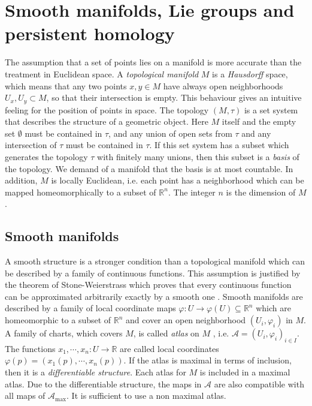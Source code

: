 \documentclass[runningheads,orivec]{llncs}
\begin{document}
\section{Smooth manifolds, Lie groups and persistent homology}
The assumption that a set of points lies on a manifold is more accurate than the treatment in Euclidean space. A \emph{topological manifold} $M$ is a \emph{Hausdorff} space, which means that any two points $x,y \in M$ have always open neighborhoods $U_x,U_y \subset M$, so that their intersection is empty. This behaviour gives an intuitive feeling for the position of points in space. The topology $(M, \tau)$ is a set system that describes the structure of a geometric object. Here $M$ itself and the empty set $\emptyset$ must be contained in $\tau$, and any union of open sets from $\tau$ and any intersection of $\tau$ must be contained in $\tau$. If this set system has a subset which generates the topology $\tau$ with finitely many unions, then this subset is a \emph{basis} of the topology. We demand of a manifold that the basis is at most countable. In addition, $M$ is locally Euclidean, i.e. each point has a neighborhood which can be mapped homeomorphically to a subset of $\mathbb{R}^n$. The integer $n$ is the dimension of $M$. 

\subsection{Smooth manifolds}
A smooth structure is a stronger condition than a topological manifold which can be described by a family of continuous functions. This assumption is justified by the theorem of Stone-Weierstrass which proves that every continuous function can be approximated arbitrarily exactly by a smooth one \cite{stone1948generalized}. Smooth manifolds are described by a family of local coordinate maps $\varphi: U \rightarrow \varphi(U) \subseteq \mathbb{R}^n$ which are homeomorphic to a subset of $\mathbb{R}^{n}$ and cover an open neighborhood $(U_i,\varphi_i)$ in $M$. A family of charts, which covers $M$, is called \emph{atlas} on $M$ \cite{lee2013smooth}, i.e. $\mathscr{A} = (U_i,\varphi_i)_{i \in I}$. The functions $x_1, \cdots, x_n: U \rightarrow \mathbb{R}$ are called local coordinates $\varphi(p) = (x_1(p), \cdots, x_n(p))$. If the atlas is maximal in terms of inclusion, then it is a \emph{differentiable structure}. Each atlas for $M$ is included in a maximal atlas. Due to the differentiable structure, the maps in $\mathscr{A}$ are also compatible with all maps of $\mathscr{A}_{\text{max}}$. It is sufficient to use a non maximal atlas.
\end{document}
